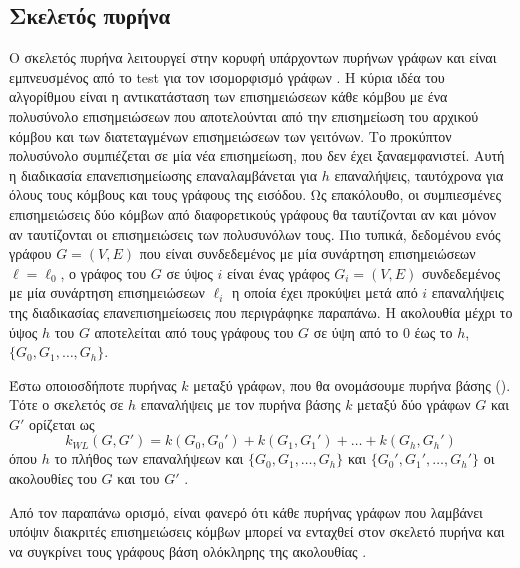 \subsection{Σκελετός πυρήνα }
\label{ssec:wl}
Ο σκελετός πυρήνα  λειτουργεί στην κορυφή υπάρχοντων πυρήνων γράφων και είναι εμπνευσμένος από το test  για τον ισομορφισμό γράφων \cite{weisfeiler1968reduction}.
Η κύρια ιδέα του αλγορίθμου  είναι η αντικατάσταση των επισημειώσεων κάθε κόμβου με ένα πολυσύνολο επισημειώσεων που αποτελούνται από την επισημείωση του αρχικού κόμβου και των διατεταγμένων επισημειώσεων των γειτόνων.
Το προκύπτον πολυσύνολο συμπιέζεται σε μία νέα επισημείωση, που δεν έχει ξαναεμφανιστεί.
Αυτή η διαδικασία επανεπισημείωσης επαναλαμβάνεται για $h$ επαναλήψεις, ταυτόχρονα για όλους τους κόμβους και τους γράφους της εισόδου.
Ως επακόλουθο, οι συμπιεσμένες επισημειώσεις δύο κόμβων από διαφορετικούς γράφους θα ταυτίζονται αν και μόνον αν ταυτίζονται οι επισημειώσεις των πολυσυνόλων τους.
Πιο τυπικά, δεδομένου ενός γράφου $G=(V,E)$ που είναι συνδεδεμένος με μία συνάρτηση επισημειώσεων $\ell=\ell_0$, ο γράφος  του $G$ σε ύψος $i$ είναι ένας γράφος $G_i=(V,E)$ συνδεδεμένος με μία συνάρτηση επισημειώσεων $\ell_i$ η οποία έχει προκύψει μετά από $i$ επαναλήψεις της διαδικασίας επανεπισημείωσεις που περιγράφηκε παραπάνω.
Η ακολουθία  μέχρι το ύψος $h$ του $G$ αποτελείται από τους γράφους  του $G$ σε ύψη από το $0$ έως το $h$, $\{ G_0,G_1,\ldots,G_h\}$. 
\begin{definition}
	Έστω οποιοσδήποτε πυρήνας $k$ μεταξύ γράφων, που θα ονομάσουμε πυρήνα βάσης ().
	Τότε ο σκελετός  σε $h$ επαναλήψεις με τον πυρήνα βάσης $k$ μεταξύ δύο γράφων $G$ και $G'$ ορίζεται ως
	\begin{equation}
		k_{WL}(G,G') = k(G_0,G_0') + k(G_1,G_1') + \ldots + k(G_h,G_h')
	\end{equation}
	όπου $h$ το πλήθος των επαναλήψεων  και $\{ G_0,G_1,\ldots,G_h\}$ και $\{ G_0',G_1',\ldots,G_h'\}$ οι ακολουθίες  του $G$ και του $G'$ .
\end{definition}
Από τον παραπάνω ορισμό, είναι φανερό ότι κάθε πυρήνας γράφων που λαμβάνει υπόψιν διακριτές επισημειώσεις κόμβων μπορεί να ενταχθεί στον σκελετό πυρήνα  και να συγκρίνει τους γράφους βάση ολόκληρης της ακολουθίας .\par

